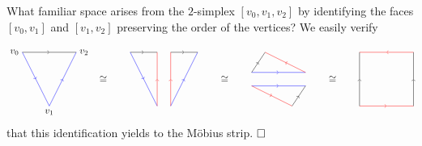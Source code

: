\documentclass[11pt]{book}
\numberwithin{dummy}{section}
\theoremstyle{nonumberbreak}
\newenvironment{sol}[1][]{\ifthenelse{\equal{#1}{}}{\solution}{\solution[#1]}\rm}{\endsolution}
\newenvironment{prob}[1][]{\ifthenelse{\equal{#1}{}}{\problem}{\problem[#1]}\rm}{\endproblem}
\begin{document}
\begin{spacing}{1.4}
\begin{prob} %
What familiar space arises from the $2$-simplex $[v_0,v_1,v_2]$ by identifying the faces $[v_0,v_1]$ and $[v_1,v_2]$ preserving the order of the vertices?
\begin{sol}
We easily verify

$$
\begin{tikzpicture}
\draw[->] (0,0) -- (1,0);
\draw (1,0) -- (2,0);
\draw[->,color=blue] (0,0) -- (0.5,-1);
\draw[color=blue] (0.5,-1) -- (1,-2);
\draw[->,color=blue] (1,-2) -- (1.5,-1);
\draw[color=blue] (1.5,-1) -- (2,0);
\draw (0,0) node[left] {$v_0$};
\draw (2,0) node[right] {$v_2$};
\draw (1,-2) node[below] {$v_1$};

\draw (3,-1) node {$\cong$};

\draw[->] (4,0) -- (4.5,0);
\draw (4.5,0) -- (5,0);
\draw[->, color=blue] (4,0) -- (4.5,-1);
\draw[color=blue] (4.5,-1) -- (5,-2);
\draw[color=red, ->] (5,-2) -- (5,-1);
\draw[color=red] (5,-1) -- (5,0);

\draw[color=red] (5.5,-1) -- (5.5,0);
\draw[color=red,->] (5.5,-2) -- (5.5,-1);
\draw[color=blue,->] (5.5,-2) -- (6,-1);
\draw[color=blue] (6,-1) -- (6.5,0);
\draw[->] (5.5,0) -- (6,0);
\draw (6,0) -- (6.5,0);

\draw (7.5,-1) node {$\cong$};

\draw[color=blue,->] (8.5,-0.75) -- (9.5,-0.75);
\draw[color=blue] (9.5,-0.75) -- (10.5,-0.75);
\draw[->] (8.5,-0.75) -- (8.75,-0.375);
\draw (8.75,-0.375) -- (9,0);
\draw[color=red,->]  (10.5,-0.75) -- (9.75,-0.375);
\draw[color=red] (9.75,-0.375) -- (9,0);
\draw[color=blue,->] (8.5,-1.25) -- (9.5,-1.25);
\draw[color=blue] (9.5,-1.25) -- (10.5,-1.25);
\draw[color=red,->] (8.5,-1.25) -- (9.25,-1.625);
\draw[color=red] (9.25,-1.625) -- (10,-2);
\draw[->] (10,-2) -- (10.25,-1.625);
\draw (10.25,-1.625) -- (10.5,-1.25);

\draw (11.5,-1) node {$\cong$};
 
 \draw[color=red,->] (14.5,0) -- (13.5,0);
 \draw[color=red] (13.5,0) -- (12.5,0);
 \draw[color=red,->] (12.5,-2) -- (13.5,-2);
 \draw[color=red] (13.5,-2) -- (14.5,-2);
 \draw[->] (14.5,-2) -- (14.5,-1);
 \draw (14.5,-1) -- (14.5,0);
 \draw[->] (12.5,-2) -- (12.5,-1);
 \draw (12.5,-1) -- (12.5,0);


\end{tikzpicture}
$$
that this identification yields to the Möbius strip. $\hfill \Box$


\end{sol}



\end{prob}
\end{spacing}
\end{document}

